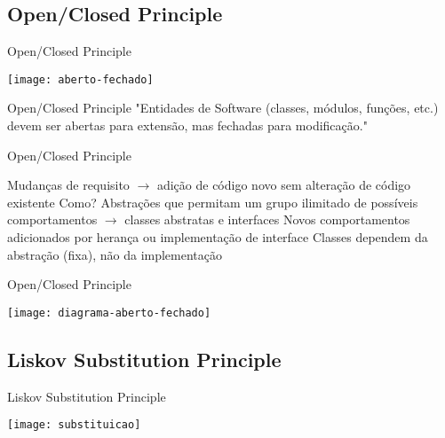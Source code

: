 \documentclass{beamer}
\begin{document}
\subsection{Open/Closed Principle}

\begin{frame}{Open/Closed Principle}
  \begin{center}
    \texttt{[image: aberto-fechado]}
  \end{center}
\end{frame}

\begin{frame}{Open/Closed Principle}
 "Entidades de Software (classes, módulos, funções, etc.) devem ser abertas para extensão, mas fechadas para modificação."
\end{frame}

\begin{frame}{Open/Closed Principle}
 \begin{outline}
  \1 
   Mudanças de requisito $\rightarrow$ adição de código novo sem alteração de código existente
   Como?
     Abstrações que permitam um grupo ilimitado de possíveis comportamentos $\rightarrow$ classes abstratas e interfaces
     Novos comportamentos adicionados por herança ou implementação de interface
     Classes dependem da abstração (fixa), não da implementação
 \end{outline}
\end{frame}

\begin{frame}{Open/Closed Principle}
  \begin{center}
    \texttt{[image: diagrama-aberto-fechado]}
  \end{center}
\end{frame}

\subsection{Liskov Substitution Principle}

\begin{frame}{Liskov Substitution Principle}
  \begin{center}
    \texttt{[image: substituicao]}
  \end{center}
\end{frame}
\end{document}
